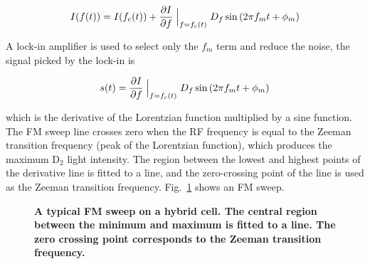 \begin{equation}
I(f(t))=I(f_{c}(t))+\frac{\partial I}{\partial f}\Bigm|_{f=f_{c}(t)}D_{f}\sin{\left(2\pi f_{m}t+\phi_{m}\right)}
\end{equation}

A lock-in amplifier is used to select only the $f_{m}$ term and reduce the noise, the signal picked by the lock-in is

\begin{equation}
s(t)=\frac{\partial I}{\partial f}\Bigm|_{f=f_{c}(t)}D_{f}\sin{\left(2\pi f_{m}t+\phi_{m}\right)}
\end{equation}

which is the derivative of the Lorentzian function multiplied by a sine function. The FM sweep line crosses zero when the RF frequency is equal to the Zeeman transition frequency (peak of the Lorentzian function), which produces the maximum D$_{2}$ light intensity. The region between the lowest and highest points of the derivative line is fitted to a line, and the zero-crossing point of the line is used as the Zeeman transition frequency. Fig.~\ref{fmsweep} shows an FM sweep.

\begin{figure}[t!]
	\centering
	\caption{{\bf A typical FM sweep on a hybrid cell. The central region between the minimum and maximum is fitted to a line. The zero crossing point corresponds to the Zeeman transition frequency.}}
	\label{fmsweep}
\end{figure}

